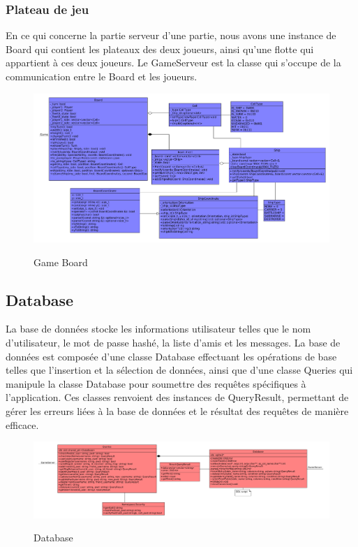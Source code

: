 \documentclass[../design_fonctionnement_sys.tex]{subfiles}
\begin{document}
\newpage
\subsubsection{Plateau de jeu}
En ce qui concerne la partie serveur d'une partie, nous avons une instance de Board qui contient les plateaux des deux joueurs, 
ainsi qu'une flotte qui appartient à ces deux joueurs. Le GameServeur est la classe qui s'occupe de la communication entre le Board et les joueurs.
\begin{figure}[H]
    \centering
    \includegraphics[scale=0.3]{img_design/4.9.2_board_design.png}
    \label{fig:seq_match_server}
    \caption{Game Board}
\end{figure}

\newpage
\subsection{Database}
La base de données stocke les informations utilisateur telles que le nom d'utilisateur, 
le mot de passe hashé, la liste d'amis et les messages.
La base de données est composée d'une classe Database effectuant les opérations de base telles que l'insertion et la sélection de données, 
ainsi que d'une classe Queries qui manipule la classe Database pour soumettre des requêtes spécifiques à l'application. 
Ces classes renvoient des instances de QueryResult, permettant de gérer les erreurs liées à la base de données et le résultat des requêtes de manière efficace.
\begin{figure}[H]
    \centering
    \includegraphics[scale=0.25]{img_design/dia_db.png}
    \label{fig:seq_match_server}
    \caption{Database}
\end{figure}
\end{document}
